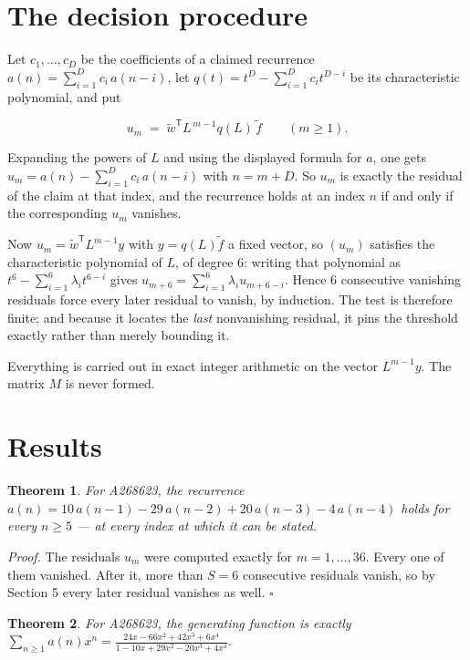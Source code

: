 \documentclass[11pt]{article}
\newtheorem{theorem}{Theorem}
\theoremstyle{definition}
\begin{document}
\section{The decision procedure}

Let $c_1,\dots,c_D$ be the coefficients of a claimed recurrence $a(n) = \sum_{i=1}^{D} c_i\,a(n-i)$, let $q(t) = t^{D} - \sum_{i=1}^{D} c_i t^{D-i}$ be its characteristic polynomial, and put

\[u_m \;=\; \tilde w^{\mathsf T} L^{\,m-1} q(L)\,\tilde f \qquad (m \ge 1).\]

Expanding the powers of $L$ and using the displayed formula for $a$, one gets $u_m = a(n) - \sum_{i=1}^{D} c_i\,a(n-i)$ with $n = m + D$. So $u_m$ is exactly the residual of the claim at that index, and the recurrence holds at an index $n$ if and only if the corresponding $u_m$ vanishes.

Now $u_m = \tilde w^{\mathsf T} L^{m-1} y$ with $y = q(L)\tilde f$ a fixed vector, so $(u_m)$ satisfies the characteristic polynomial of $L$, of degree $6$: writing that polynomial as $t^{6} - \sum_{i=1}^{6} \lambda_i t^{6-i}$ gives $u_{m+6} = \sum_{i=1}^{6} \lambda_i u_{m+6-i}$. Hence $6$ consecutive vanishing residuals force every later residual to vanish, by induction. The test is therefore finite; and because it locates the {\itshape last} nonvanishing residual, it pins the threshold exactly rather than merely bounding it.

Everything is carried out in exact integer arithmetic on the vector $L^{m-1}y$. The matrix $M$ is never formed.

\section{Results}

\begin{theorem} For A268623, the recurrence $a(n) = 10\,a(n-1) - 29\,a(n-2) + 20\,a(n-3) - 4\,a(n-4)$ holds for every $n \ge 5$ --- at every index at which it can be stated.\end{theorem}

{\itshape Proof.} The residuals $u_m$ were computed exactly for $m = 1,\dots,36$. Every one of them vanished. After it, more than $S = 6$ consecutive residuals vanish, so by Section 5 every later residual vanishes as well. $\square$

\begin{theorem} For A268623, the generating function is exactly $\sum_{n\ge 1} a(n)x^n = \frac{24x - 66x^{2} + 42x^{3} + 6x^{4}}{1 - 10x + 29x^{2} - 20x^{3} + 4x^{4}}$.\end{theorem}
\end{document}
